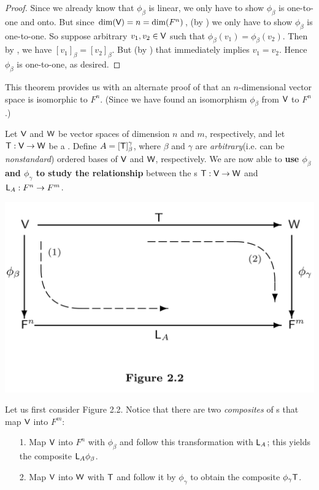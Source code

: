 \begin{proof}
Since we already know that \(\phi_{\beta}\) is linear, we only have to show \(\phi_{\beta}\) is one-to-one and onto.
But since \(\dim(\textsf{V}) = n = \dim(F^n)\), (by ) we only have to show \(\phi_{\beta}\) is one-to-one.
So suppose arbitrary \(v_1, v_2 \in \textsf{V}\) such that \(\phi_{\beta}(v_1) = \phi_{\beta}(v_2)\).
Then by , we have \([v_1]_{\beta} = [v_2]_{\beta}\).
But (by ) that immediately implies \(v_1 = v_2\).
Hence \(\phi_{\beta}\) is one-to-one, as desired.
\end{proof}

\begin{remark} \label{remark 2.4.5}
This theorem provides us with an alternate proof of  that an \(n\)-dimensional vector space is isomorphic to \(F^n\).
(Since we have found an isomorphism \(\phi_{\beta}\) from \(\textsf{V}\) to \(F^n\).)
\end{remark}

Let \(\textsf{V}\) and \(\textsf{W}\) be vector spaces of dimension \(n\) and \(m\), respectively, and let \(\textsf{T} : \textsf{V} \to \textsf{W}\) be a \LTRAN{}.
Define \(A = [\textsf{T}]_{\beta}^{\gamma}\), where \(\beta\) and \(\gamma\) are \emph{arbitrary}(i.e. can be \emph{nonstandard}) ordered bases of \(\textsf{V}\) and \(\textsf{W}\), respectively.
We are now able to \textbf{use \(\phi_{\beta}\) and \(\phi_{\gamma}\) to study the relationship} between the \LTRAN{}s \(\textsf{T} : \textsf{V} \to \textsf{W}\) and
\(\textsf{L}_A: F^n \to F^m\).

\includegraphics[width=16cm]{images/figure-2-2.png}

Let us first consider Figure 2.2.
Notice that there are two \emph{composites} of \LTRAN{}s that map \(\textsf{V}\) into \(F^m\):
\begin{enumerate}
\item[1.] Map \(\textsf{V}\) into \(F^n\) with \(\phi_{\beta}\) and follow this transformation with \(\textsf{L}_A\);
    this yields the composite \(\textsf{L}_A \phi_{\beta}\).
\item[2.] Map \(\textsf{V}\) into \(\textsf{W}\) with \(\textsf{T}\) and follow it by \(\phi_{\gamma}\) to obtain the composite \(\phi_{\gamma} \textsf{T}\).
\end{enumerate}


